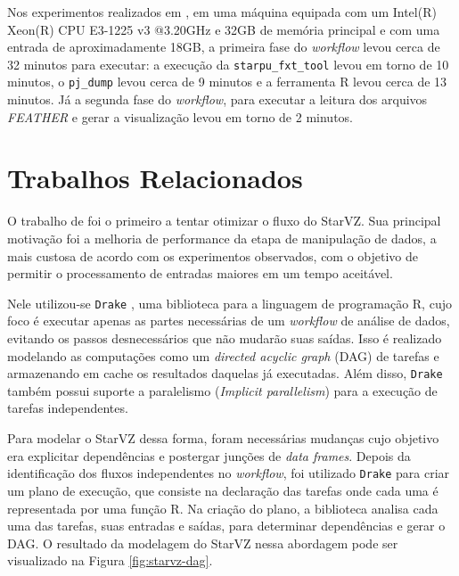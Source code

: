 Nos experimentos realizados em \citet{ref:starvz}, em uma máquina equipada com 
um Intel(R) Xeon(R) 
CPU E3-1225 v3 @3.20GHz e 32GB de memória principal e com uma entrada de 
aproximadamente 18GB, a 
primeira fase do \emph{workflow} levou cerca de 32 minutos para executar: a 
execução da \texttt{starpu\_fxt\_tool}
levou em torno de 10 minutos, o \texttt{pj\_dump} levou cerca de 9 minutos e a 
ferramenta R levou cerca de 13
minutos. Já a segunda fase do \emph{workflow}, para executar a leitura dos 
arquivos \emph{FEATHER} e gerar
a visualização levou em torno de 2 minutos.

\section{Trabalhos Relacionados}\label{sect:related-work}

O trabalho de \citet{ref:drakestarvz} foi o primeiro a tentar otimizar o fluxo 
do StarVZ. 
Sua principal motivação foi a melhoria de performance da etapa de manipulação 
de 
dados, a mais
custosa de acordo com os experimentos observados, com o objetivo de permitir o 
processamento de 
entradas maiores em um tempo aceitável.

Nele utilizou-se \texttt{Drake} \cite{ref:drake}, uma biblioteca para a 
linguagem de programação R, cujo foco é executar apenas as 
partes necessárias de um \emph{workflow} de análise de dados, evitando os 
passos 
desnecessários que não mudarão
suas saídas. Isso é realizado modelando as computações como um \emph{directed 
acyclic graph} (DAG) de tarefas e 
armazenando em cache os resultados daquelas já executadas. Além disso, 
\texttt{Drake} também possui suporte a paralelismo
(\emph{Implicit parallelism}) para a execução de tarefas independentes.

Para modelar o StarVZ dessa forma, foram necessárias mudanças cujo objetivo era 
explicitar 
dependências e postergar junções de \emph{data frames}. Depois da identificação 
dos fluxos independentes    
no \emph{workflow}, foi utilizado \texttt{Drake} para criar um plano de 
execução, que consiste na declaração
das tarefas onde cada uma é representada por uma função R. Na criação do plano, 
a biblioteca analisa cada
uma das tarefas, suas entradas e saídas, para determinar dependências e gerar o 
DAG. O resultado da modelagem do
StarVZ nessa abordagem pode ser visualizado na Figura \ref{fig:starvz-dag}.

